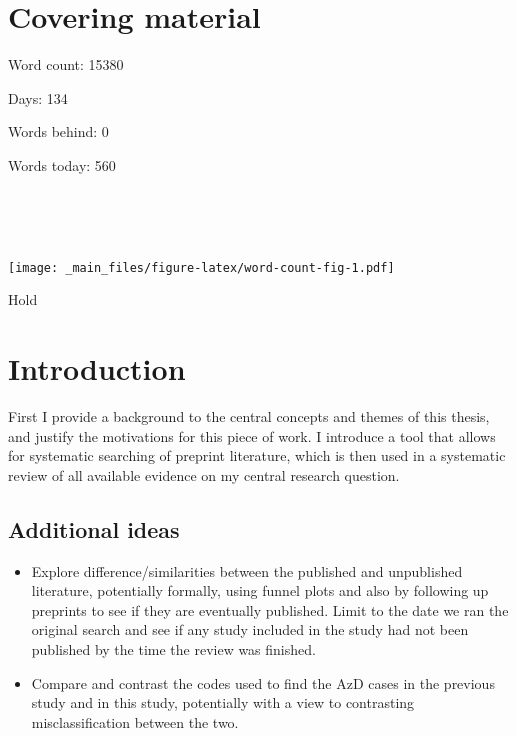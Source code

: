 \documentclass[a4paper, twoside]{templates/ociamthesis}
\providecommand{\tightlist}{%
  \setlength{\itemsep}{0pt}\setlength{\parskip}{0pt}}
\begin{document}
\flushbottom

\hypertarget{covering-material}{%
\chapter*{Covering material}\label{covering-material}}

\adjustmtc

Word count: 15380

Days: 134

Words behind: 0

Words today: 560

~

~

\texttt{[image: \_main\_files/figure-latex/word-count-fig-1.pdf]}

\begin{savequote}
Hold
\end{savequote}



\hypertarget{intro-heading}{%
\chapter{Introduction}\label{intro-heading}}

\minitoc 

First I provide a background to the central concepts and themes of this thesis, and justify the motivations for this piece of work. I introduce a tool that allows for systematic searching of preprint literature, which is then used in a systematic review of all available evidence on my central research question.

\hypertarget{additional-ideas}{%
\section{Additional ideas}\label{additional-ideas}}

\begin{itemize}
\tightlist
\item
  Explore difference/similarities between the published and unpublished literature, potentially formally, using funnel plots and also by following up preprints to see if they are eventually published. Limit to the date we ran the original search and see if any study included in the study had not been published by the time the review was finished.
\item
  Compare and contrast the codes used to find the AzD cases in the previous study and in this study, potentially with a view to contrasting misclassification between the two.
\end{itemize}
\end{document}
